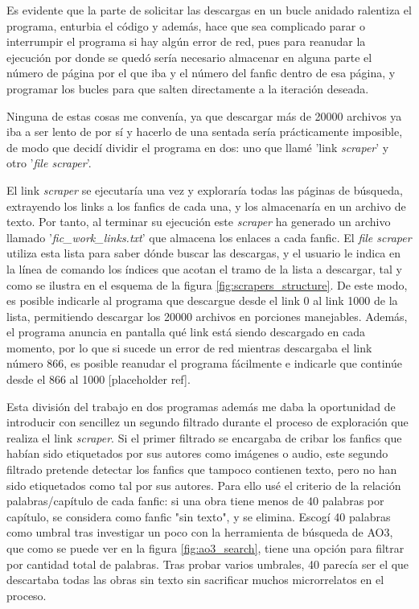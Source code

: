 \documentclass{pre-tfg}
\newcommand{\refToScraperExecution}{[placeholder ref]}
\begin{document}
Es evidente que la parte de solicitar las descargas en un bucle anidado ralentiza el programa, enturbia el código y además, hace que sea complicado parar o interrumpir el programa si hay algún error de red, pues para reanudar la ejecución por donde se quedó sería necesario almacenar en alguna parte el número de página por el que iba y el número del fanfic dentro de esa página, y programar los bucles para que salten directamente a la iteración deseada.

Ninguna de estas cosas me convenía, ya que descargar más de 20000 archivos ya iba a ser lento de por sí y hacerlo de una sentada sería prácticamente imposible, de modo que decidí dividir el programa en dos: uno que llamé 'link \textit{scraper}' y otro '\textit{file scraper}'.



El link \textit{scraper} se ejecutaría una vez y exploraría todas las páginas de búsqueda, extrayendo los links a los fanfics de cada una, y los almacenaría en un archivo de texto. Por tanto, al terminar su ejecución este \textit{scraper} ha generado un archivo llamado '\textit{fic\_work\_links.txt}' que almacena los enlaces a cada fanfic. El \textit{file scraper} utiliza esta lista para saber dónde buscar las descargas, y el usuario le indica en la línea de comando los índices que acotan el tramo de la lista a descargar, tal y como se ilustra en el esquema de la figura \ref{fig:scrapers_structure}. De este modo, es posible indicarle al programa que descargue desde el link 0 al link 1000 de la lista, permitiendo descargar los 20000 archivos en porciones manejables. Además, el programa anuncia en pantalla qué link está siendo descargado en cada momento, por lo que si sucede un error de red mientras descargaba el link número 866, es posible reanudar el programa fácilmente e indicarle que continúe desde el 866 al 1000 \refToScraperExecution.

Esta división del trabajo en dos programas además me daba la oportunidad de introducir con sencillez un segundo filtrado durante el proceso de exploración que realiza el link \textit{scraper}. Si el primer filtrado se encargaba de cribar los fanfics que habían sido etiquetados por sus autores como imágenes o audio, este segundo filtrado pretende detectar los fanfics que tampoco contienen texto, pero no han sido etiquetados como tal por sus autores. Para ello usé el criterio de la relación palabras/capítulo de cada fanfic: si una obra tiene menos de 40 palabras por capítulo, se considera como fanfic "sin texto", y se elimina. Escogí 40 palabras como umbral tras investigar un poco con la herramienta de búsqueda de AO3, que como se puede ver en la figura \ref{fig:ao3_search}, tiene una opción para filtrar por cantidad total de palabras. Tras probar varios umbrales, 40 parecía ser el que descartaba todas las obras sin texto sin sacrificar muchos microrrelatos en el proceso.
\end{document}
